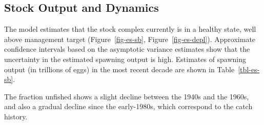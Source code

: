 \documentclass[
]{scrartcl}
\begin{document}
\subsection*{Stock Output and Dynamics}\label{stock-output-and-dynamics}

The model estimates that the stock complex currently is in a healthy
state, well above management target (Figure~\ref{fig-es-sb},
Figure~\ref{fig-es-depl}). Approximate confidence intervals based on the
asymptotic variance estimates show that the uncertainty in the estimated
spawning output is high. Estimates of spawning output (in trillions of
eggs) in the most recent decade are shown in Table~\ref{tbl-es-sb}.

The fraction unfished shows a slight decline between the 1940s and the
1960s, and also a gradual decline since the early-1980s, which
correspond to the catch history.

\newpage

\begingroup
\fontsize{9.0pt}{10.8pt}\selectfont
\end{document}
